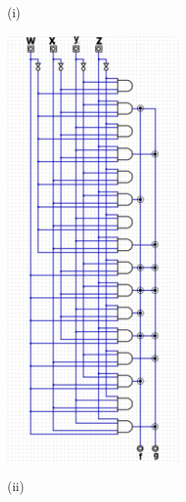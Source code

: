 \documentclass{article}
\begin{document}
    \quad\quad (i)

    \begin{center}
        \includegraphics[width=50mm,scale=0.5]{HW3_q7.jpg}
    \end{center}

    \quad\quad (ii)
\end{document}
